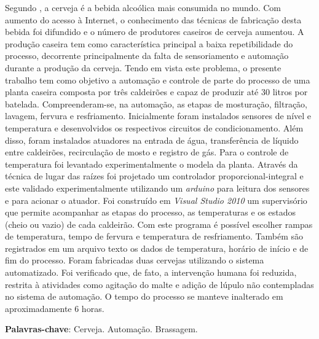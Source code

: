 \setlength{\absparsep}{18pt} %
\begin{resumo}
	Segundo , a cerveja é a bebida alcoólica mais consumida no mundo. Com aumento do acesso à Internet, o conhecimento das técnicas de fabricação desta bebida foi difundido e o número de produtores caseiros de cerveja aumentou. A produção caseira tem como característica principal a baixa repetibilidade do processo, decorrente principalmente da falta de sensoriamento e automação durante a produção da cerveja.
Tendo em vista este problema, o presente trabalho tem como objetivo a automação e controle de parte do processo de uma planta caseira composta por três caldeirões e capaz de produzir até 30 litros por batelada. Compreenderam-se, na automação, as etapas de mosturação, filtração, lavagem, fervura e resfriamento. Inicialmente foram instalados sensores de nível e temperatura e desenvolvidos os respectivos circuitos de condicionamento. Além disso, foram instalados atuadores na entrada de água, transferência de líquido entre caldeirões, recirculação de mosto e registro de gás.
Para o controle de temperatura foi levantado experimentalmente o modela da planta. Através da técnica de lugar das raízes foi projetado um controlador proporcional-integral e este validado experimentalmente utilizando um \textit{arduino} para leitura dos sensores e para acionar o atuador. 
Foi construído em \textit{Visual Studio 2010} um supervisório que permite acompanhar as etapas do processo, as temperaturas e os estados (cheio ou vazio) de cada caldeirão. Com este programa é possível escolher rampas de temperatura, tempo de fervura e temperatura de resfriamento.  Também são registrados em um arquivo texto os dados de temperatura, horário de início e de fim do processo. 
Foram fabricadas duas cervejas utilizando o sistema automatizado. Foi verificado que, de fato, a intervenção humana foi reduzida, restrita à atividades como agitação do malte e adição de lúpulo não contempladas no sistema de automação. O tempo do processo se manteve inalterado em aproximadamente 6 horas. 
	

	\vspace{\onelineskip}
	\textbf{Palavras-chave}: Cerveja. Automação. Brassagem.
\end{resumo}

